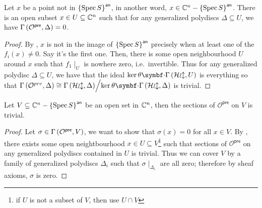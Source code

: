 \begin{lemma}\label{thm:trivial-preanalytification-sheaf-on-generalized-polydisc-outside}
  Let $x$ be a point not in ${\left\{{\operatorname{Spec}{S}}\right\}}^{\mathsf{an}}$, in another word, $x \in \mathbb{C}^{n} - {\left\{{\operatorname{Spec}{S}}\right\}}^{\mathsf{an}}$.
  There is an open subset $x \in U \subseteq \mathbb{C}^{n}$ such that for any generalized polydiscs $\Delta \subseteq U$, we have ${\Gamma\left(\mathcal{O}^{\mathsf{pre}},\Delta\right)} = 0$.
\end{lemma}
\begin{proof}
  By , $x$ is not in the image of ${\left\{{\operatorname{Spec}{S}}\right\}}^{\mathsf{an}}$ precisely when at least one of the $f_{i}(x) \ne 0$. Say it's the first one. Then, there is some open neighbourhood $U$ around $x$ such that $f_{1}\mid_{U}$ is nowhere zero, i.e.\ invertible. Thus for any generalized polydisc $\Delta \subseteq U$, we have that the ideal $\ker\theta\smul\sections{\sheafHol}U$ is everything so that $\sections{\mathcal{O}^{pre}}{\Delta}\cong\quotient{\sections{\sheafHol}{\Delta}}{\ker\theta\smul\sections{\sheafHol}{\Delta}}$ is trivial.
\end{proof}
\begin{corollary}\label{thm:trivial-preanalytification-sheaf-on-outside-open-set}
  Let $V \subseteq \mathbb{C}^{n}-{\left\{{\operatorname{Spec} S}\right\}}^{\mathsf{an}}$ be an open set in $\mathbb{C}^{n}$, then the sections of $\mathcal{O}^{\mathsf{pre}}$ on $V$ is trivial.
\end{corollary}
\begin{proof}
  Let $\sigma \in {\Gamma\left(\mathcal{O}^{\mathsf{pre}},V\right)}$, we want to show that $\sigma(x) = 0$ for all $x \in V$. By , there exists some open neightbourhood $x \in U \subseteq V$\footnote{if $U$ is not a subset of $V$, then use $U \cap V$} such that
  sections of $\mathcal{O}^{\mathsf{pre}}$ on any generalized polydiscs contained in $U$ is trivial. Thus we can cover $V$ by a family of generalized polydiscs $\Delta_{i}$ such that $\sigma\mid_{\Delta_{i}}$ are all zero; therefore by sheaf axioms, $\sigma$ is zero.
\end{proof}

